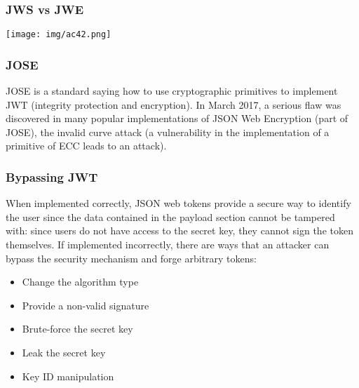 \documentclass[a4paper, 10pt, titlepage]{article}
\begin{document}
\subsubsection{JWS vs JWE}
\begin{center}
\texttt{[image: img/ac42.png]}
\end{center}

\subsubsection{JOSE}
JOSE is a standard saying how to use cryptographic primitives to implement JWT (integrity protection and encryption). In March 2017, a serious flaw was discovered in many popular implementations of JSON Web Encryption (part of JOSE), the invalid curve attack (a vulnerability in the implementation of a primitive of ECC leads to an attack).


\subsubsection{Bypassing JWT}
When implemented correctly, JSON web tokens provide a secure way to identify the user since the data contained in the payload section cannot be tampered with: since users do not have access to the secret key, they cannot sign the token themselves.
If implemented incorrectly, there are ways that an attacker can bypass the security mechanism and forge arbitrary tokens:
\begin{itemize}
\item Change the algorithm type
\item Provide a non-valid signature
\item Brute-force the secret key
\item Leak the secret key
\item Key ID manipulation
\end{itemize}
\end{document}
